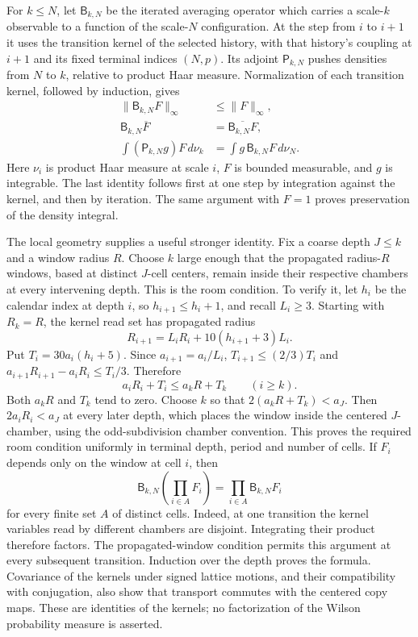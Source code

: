 For $k\leq N$, let $\mathsf B_{k,N}$ be the iterated averaging operator
which carries a scale-$k$ observable to a function of the scale-$N$
configuration. At the step from $i$ to $i+1$ it uses the transition kernel
of the selected history, with that history's coupling at $i+1$ and its
fixed terminal indices $(N,p)$. Its adjoint $\mathsf P_{k,N}$ pushes
densities from $N$ to $k$, relative to product Haar measure. Normalization
of each transition kernel, followed by induction, gives
\begin{align*}
 \|\mathsf B_{k,N}F\|_\infty&\leq\|F\|_\infty,\\
 \mathsf B_{k,N}\overline F&=\overline{\mathsf B_{k,N}F},\\
 \int (\mathsf P_{k,N}g)F\,d\nu_k
   &=\int g\,\mathsf B_{k,N}F\,d\nu_N.
\end{align*}
Here $\nu_i$ is product Haar measure at scale $i$, $F$ is bounded
measurable, and $g$ is integrable. The last identity follows first at one
step by integration against the kernel, and then by iteration. The same
argument with $F=1$ proves preservation of the density integral.

The local geometry supplies a useful stronger identity. Fix a coarse depth
$J\leq k$ and a window radius $R$. Choose $k$ large enough that the
propagated radius-$R$ windows, based at distinct $J$-cell centers, remain
inside their respective chambers at every intervening depth. This is the
room condition. To verify it, let $h_i$ be the calendar index at depth
$i$, so $h_{i+1}\leq h_i+1$, and recall $L_i\geq3$. Starting with
$R_k=R$, the kernel read set has propagated radius
\[
 R_{i+1}=L_iR_i+10(h_{i+1}+3)L_i.
\]
Put $T_i=30a_i(h_i+5)$. Since $a_{i+1}=a_i/L_i$,
$T_{i+1}\leq(2/3)T_i$ and
$a_{i+1}R_{i+1}-a_iR_i\leq T_i/3$. Therefore
\[
 a_iR_i+T_i\leq a_kR+T_k\qquad(i\geq k).
\]
Both $a_kR$ and $T_k$ tend to zero. Choose $k$ so that
$2(a_kR+T_k)<a_J$. Then $2a_iR_i<a_J$ at every later depth,
which places the window inside the centered $J$-chamber, using the
odd-subdivision chamber convention. This proves the required room
condition uniformly in terminal depth, period and number of cells. If $F_i$ depends only on the window at cell $i$,
then
\begin{equation}\label{eq:actual-grid-factor}
 \mathsf B_{k,N}\left(\prod_{i\in A}F_i\right)
       =\prod_{i\in A}\mathsf B_{k,N}F_i
\end{equation}
for every finite set $A$ of distinct cells. Indeed, at one transition the
kernel variables read by different chambers are disjoint. Integrating
their product therefore factors. The propagated-window condition permits
this argument at every subsequent transition. Induction over the depth
proves the formula. Covariance of the kernels under signed lattice motions,
and their compatibility with conjugation, also show that transport commutes
with the centered copy maps. These are identities of the kernels; no
factorization of the Wilson probability measure is asserted.

